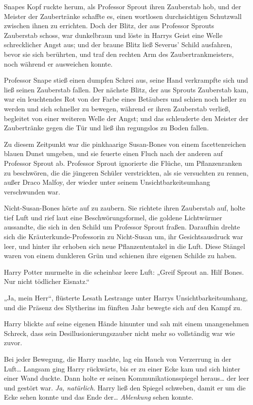 {Snapes Kopf ruckte herum, als Professor Sprout ihren Zauberstab hob, und der Meister der Zaubertränke schaffte es, einen wortlosen durchsichtigen Schutzwall zwischen ihnen zu errichten. Doch der Blitz, der aus Professor Sprouts Zauberstab schoss, war dunkelbraun und löste in Harrys Geist eine Welle schrecklicher Angst aus; und der braune Blitz ließ Severus' Schild ausfahren, bevor sie sich berührten, und traf den rechten Arm des Zaubertrankmeisters, noch während er ausweichen konnte.

Professor Snape stieß einen dumpfen Schrei aus, seine Hand verkrampfte sich und ließ seinen Zauberstab fallen. Der nächste Blitz, der aus Sprouts Zauberstab kam, war ein leuchtendes Rot von der Farbe eines Betäubers und schien noch heller zu werden und sich schneller zu bewegen, während er ihren Zauberstab verließ, begleitet von einer weiteren Welle der Angst; und das schleuderte den Meister der Zaubertränke gegen die Tür und ließ ihn regungslos zu Boden fallen.

Zu diesem Zeitpunkt war die pinkhaarige Susan-Bones von einem facettenreichen blauen Dunst umgeben, und sie feuerte einen Fluch nach der anderen auf Professor Sprout ab. Professor Sprout ignorierte die Flüche, um Pflanzenranken zu beschwören, die die jüngeren Schüler verstrickten, als sie versuchten zu rennen, außer Draco Malfoy, der wieder unter seinem Unsichtbarkeitsumhang verschwunden war.

Nicht-Susan-Bones hörte auf zu zaubern. Sie richtete ihren Zauberstab auf, holte tief Luft und rief laut eine Beschwörungsformel, die goldene Lichtwürmer aussandte, die sich in den Schild um Professor Sprout fraßen. Daraufhin drehte sich die Kräuterkunde-Professorin zu Nicht-Susan um, ihr Gesichtsausdruck war leer, und hinter ihr erhoben sich neue Pflanzententakel in die Luft. Diese Stängel waren von einem dunkleren Grün und schienen ihre eigenen Schilde zu haben.

Harry Potter murmelte in die scheinbar leere Luft: „Greif Sprout an. Hilf Bones. Nur nicht tödlicher Eisnatz.“

„Ja, mein Herr“, flüsterte Lesath Lestrange unter Harrys Unsichtbarkeitsumhang, und die Präsenz des Slytherins im fünften Jahr bewegte sich auf den Kampf zu.

Harry blickte auf seine eigenen Hände hinunter und sah mit einem unangenehmen Schreck, dass sein Desillusionierungszauber nicht mehr so vollständig war wie zuvor.

Bei jeder Bewegung, die Harry machte, lag ein Hauch von Verzerrung in der Luft… Langsam ging Harry rückwärts, bis er zu einer Ecke kam und sich hinter einer Wand duckte. Dann holte er seinen Kommunikationsspiegel heraus… der leer und gestört war. \emph{Ja, natürlich}. Harry ließ den Spiegel schweben, damit er um die Ecke sehen konnte und das Ende der… \emph{Ablenkung} sehen konnte.

}
